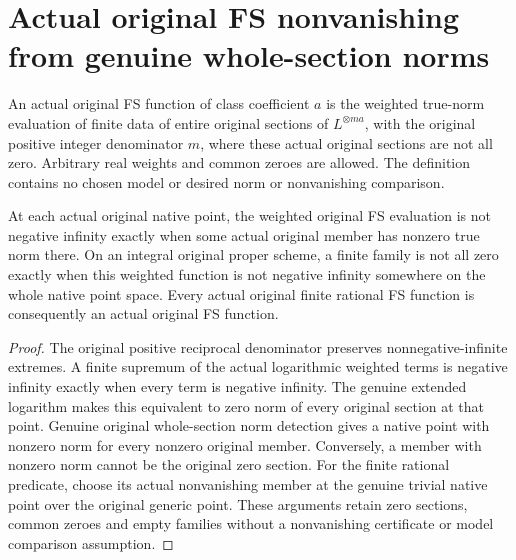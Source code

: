 \section{Actual original FS nonvanishing from genuine whole-section norms}
\label{sec:native-line-fubini-study-nonvanishing}

\begin{definition}
\label{def:native-line-whole-section-general-fs}
\leanok
{}
An actual original FS function of class coefficient $a$ is the weighted
true-norm evaluation of finite data of entire original sections of
$L^{\otimes ma}$, with the original positive integer denominator $m$, where
these actual original sections are not all zero. Arbitrary real weights and
common zeroes are allowed. The definition contains no chosen model or desired
norm or nonvanishing comparison.
\end{definition}

\begin{theorem}
\label{thm:native-line-whole-section-fs-nonvanishing}
\leanok
{}
At each actual original native point, the weighted original FS evaluation is
not negative infinity exactly when some actual original member has nonzero
true norm there. On an integral original proper scheme, a finite family is not
all zero exactly when this weighted function is not negative infinity
somewhere on the whole native point space. Every actual original finite
rational FS function is consequently an actual original FS function.
\end{theorem}
\begin{proof}
The original positive reciprocal denominator preserves nonnegative-infinite
extremes. A finite supremum of the actual logarithmic weighted terms is
negative infinity exactly when every term is negative infinity. The genuine
extended logarithm makes this equivalent to zero norm of every original
section at that point. Genuine original whole-section norm detection gives a
native point with nonzero norm for every nonzero original member. Conversely,
a member with nonzero norm cannot be the original zero section. For the finite
rational predicate, choose its actual nonvanishing member at the genuine
trivial native point over the original generic point. These arguments retain
zero sections, common zeroes and empty families without a nonvanishing
certificate or model comparison assumption.
\end{proof}
